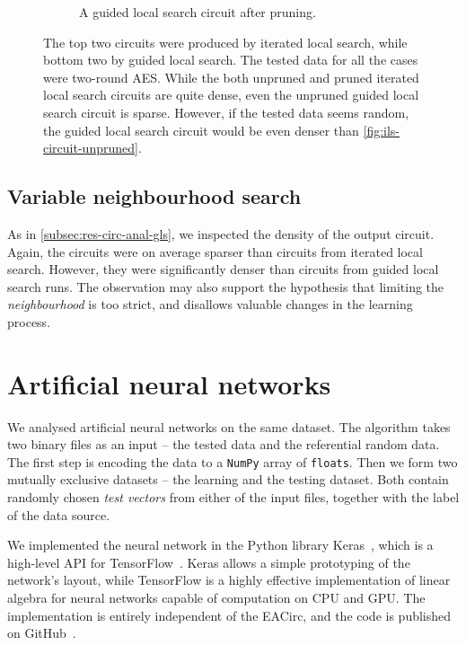\documentclass[
    digital,    %
    oneside,    %
    color,
    11pt,
    nocover,
    notable,
    nolof,
    nolot,
]{fithesis3}
\begin{document}
\begin{figure}
\begin{nomar}
\begin{subfigure}{.65\textwidth}
  \caption{A guided local search circuit after pruning.}
  \label{fig:gls-circuit-pruned}
\end{subfigure}
\end{nomar}
\caption{The top two circuits were produced by iterated local search, while bottom two by guided local search. The tested data for all the cases were two-round AES. While the both unpruned and pruned iterated local search circuits are quite dense, even the unpruned guided local search circuit is sparse. However, if the tested data seems random, the guided local search circuit would be even denser than \cref{fig:ils-circuit-unpruned}.}
\label{fig:ils-gls-circuits}
\end{figure}

\subsection{Variable neighbourhood search}
\label{subsec:res-circ-anal-vns}

As in \cref{subsec:res-circ-anal-gls}, we inspected the density of the output circuit. Again, the circuits were on average sparser than circuits from iterated local search. However, they were significantly denser than circuits from guided local search runs. The observation may also support the hypothesis that limiting the \textit{neighbourhood} is too strict, and disallows valuable changes in the learning process.



\section{Artificial neural networks}
\label{sec:res-ann}

We analysed artificial neural networks on the same dataset. The algorithm takes two binary files as an input -- the tested data and the referential random data. The first step is encoding the data to a \texttt{NumPy} array of \texttt{floats}. Then we form two mutually exclusive datasets -- the learning and the testing dataset. Both contain randomly chosen \textit{test vectors} from either of the input files, together with the label of the data source.

We implemented the neural network in the Python library Keras~\cite{chollet2015keras}, which is a high-level API for TensorFlow~\cite{abadi2016tensorflow}. Keras allows a simple prototyping of the network's layout, while TensorFlow is a highly effective implementation of linear algebra for neural networks capable of computation on CPU and GPU. The implementation is entirely independent of the EACirc, and the code is published on GitHub~\cite{EANet}.
\end{document}
